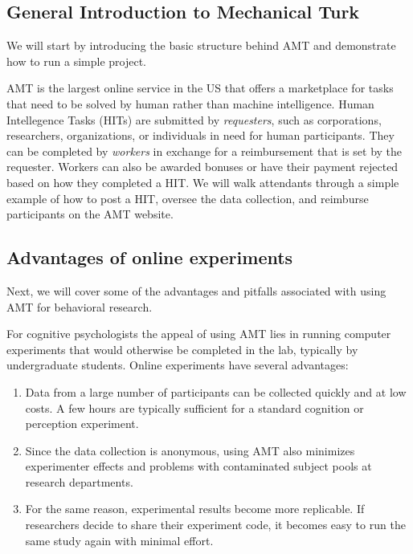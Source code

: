 \documentclass[10pt,letterpaper]{article}
\begin{document}
\subsection{General Introduction to Mechanical Turk}
We will start by introducing the basic structure behind AMT and demonstrate how
to run a simple project.

AMT is the largest online service in the US that offers a marketplace for tasks
that need to be solved by human rather than machine intelligence. Human
Intellegence Tasks (HITs) are submitted by \emph{requesters}, such as
corporations, researchers, organizations, or individuals in need for human
participants.  They can be completed by \emph{workers} in exchange for a
reimbursement that is set by the requester.  Workers can also be awarded bonuses
or have their payment rejected based on how they completed a {HIT}.  We will walk
attendants through a simple example of how to post a HIT, oversee the data
collection, and reimburse participants on the AMT website.


\subsection{Advantages of online experiments}
Next, we will cover some of the advantages and pitfalls associated with using AMT
for behavioral research.

For cognitive psychologists the appeal of using AMT lies in running computer
experiments that would otherwise be completed in the lab, typically by
undergraduate students. Online experiments have several advantages:
\begin{enumerate}
\item
    Data from a large number of participants can be collected  quickly and at low
    costs.  A few hours are typically sufficient for a standard cognition or
    perception experiment.
\item
    Since the data collection is anonymous, using AMT also minimizes experimenter
    effects and problems with contaminated subject pools at research departments.
\item 
    For the same reason, experimental results become more replicable.  If
    researchers decide to share their experiment code, it becomes easy to run the
    same study again with minimal effort.
\end{enumerate}
\end{document}
